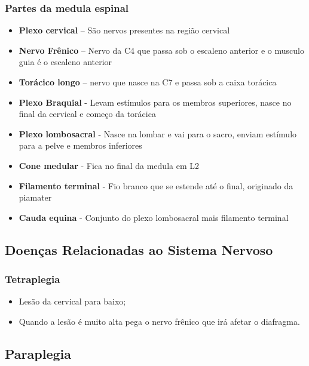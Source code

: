 \documentclass[
]{book}
\providecommand{\tightlist}{%
  \setlength{\itemsep}{0pt}\setlength{\parskip}{0pt}}
\begin{document}
\hypertarget{partes-da-medula-espinal}{%
\subsubsection{Partes da medula espinal}\label{partes-da-medula-espinal}}

\begin{itemize}
\tightlist
\item
  \textbf{Plexo cervical} -- São nervos presentes na região cervical
\item
  \textbf{Nervo Frênico} -- Nervo da C4 que passa sob o escaleno anterior e o musculo guia é o escaleno anterior
\item
  \textbf{Torácico longo} -- nervo que nasce na C7 e passa sob a caixa torácica
\item
  \textbf{Plexo Braquial} - Levam estímulos para os membros superiores, nasce no final da cervical e começo da
  torácica
\item
  \textbf{Plexo lombosacral} - Nasce na lombar e vai para o sacro, enviam estímulo para a pelve e membros inferiores
\item
  \textbf{Cone medular} - Fica no final da medula em L2
\item
  \textbf{Filamento terminal} - Fio branco que se estende até o final, originado da piamater
\item
  \textbf{Cauda equina} - Conjunto do plexo lombosacral mais filamento terminal
\end{itemize}

\hypertarget{doenuxe7as-relacionadas-ao-sistema-nervoso}{%
\subsection{Doenças Relacionadas ao Sistema Nervoso}\label{doenuxe7as-relacionadas-ao-sistema-nervoso}}

\hypertarget{tetraplegia}{%
\subsubsection{Tetraplegia}\label{tetraplegia}}

\begin{itemize}
\tightlist
\item
  Lesão da cervical para baixo;
\item
  Quando a lesão é muito alta pega o nervo frênico que irá afetar o diafragma.
\end{itemize}

\hypertarget{paraplegia}{%
\subsection{Paraplegia}\label{paraplegia}}
\end{document}
